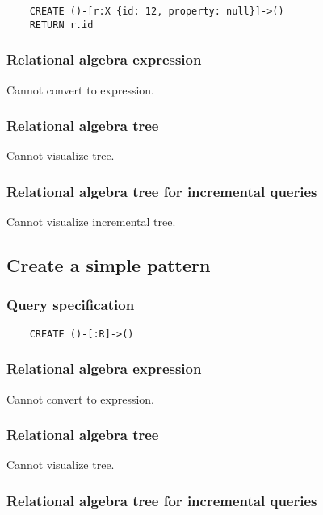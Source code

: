 	\begin{lstlisting}
	CREATE ()-[r:X {id: 12, property: null}]->()
	RETURN r.id
	\end{lstlisting}


	\subsubsection*{Relational algebra expression}

	Cannot convert to expression.

	\subsubsection*{Relational algebra tree}

	Cannot visualize tree.

	\subsubsection*{Relational algebra tree for incremental queries}

	Cannot visualize incremental tree.
	\subsection{Create a simple pattern}

	\subsubsection*{Query specification}

	\begin{lstlisting}
	CREATE ()-[:R]->()
	\end{lstlisting}


	\subsubsection*{Relational algebra expression}

	Cannot convert to expression.

	\subsubsection*{Relational algebra tree}

	Cannot visualize tree.

	\subsubsection*{Relational algebra tree for incremental queries}

